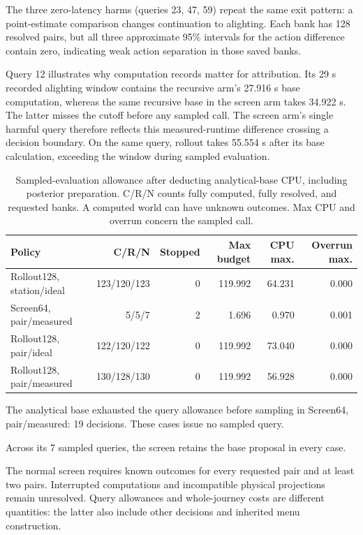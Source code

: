 The three zero-latency harms (queries 23, 47, 59) repeat the same exit pattern: a point-estimate comparison changes continuation to alighting. Each bank has 128 resolved pairs, but all three approximate 95\% intervals for the action difference contain zero, indicating weak action separation in those saved banks.

Query 12 illustrates why computation records matter for attribution. Its 29 s recorded alighting window contains the recursive arm's 27.916 s base computation, whereas the same recursive base in the screen arm takes 34.922 s. The latter misses the cutoff before any sampled call. The screen arm's single harmful query therefore reflects this measured-runtime difference crossing a decision boundary. On the same query, rollout takes 55.554 s after its base calculation, exceeding the window during sampled evaluation.

\begin{table}[ht]
\centering\small\setlength{\tabcolsep}{4pt}
\caption{Sampled-evaluation allowance after deducting analytical-base CPU, including posterior preparation. C/R/N counts fully computed, fully resolved, and requested banks. A computed world can have unknown outcomes. Max CPU and overrun concern the sampled call.}
\begin{tabular}{p{}rrrrr}
\toprule
Policy & C/R/N & Stopped & Max budget & CPU max. & Overrun max. \\
\midrule
Rollout128, station/ideal & 123/120/123 & 0 & 119.992 & 64.231 & 0.000 \\
Screen64, pair/measured & 5/5/7 & 2 & 1.696 & 0.970 & 0.001 \\
Rollout128, pair/ideal & 122/120/122 & 0 & 119.992 & 73.040 & 0.000 \\
Rollout128, pair/measured & 130/128/130 & 0 & 119.992 & 56.928 & 0.000 \\
\bottomrule
\end{tabular}
\end{table}

The analytical base exhausted the query allowance before sampling in Screen64, pair/measured: 19 decisions. These cases issue no sampled query.

Across its 7 sampled queries, the screen retains the base proposal in every case.

The normal screen requires known outcomes for every requested pair and at least two pairs. Interrupted computations and incompatible physical projections remain unresolved. Query allowances and whole-journey costs are different quantities: the latter also include other decisions and inherited menu construction.

